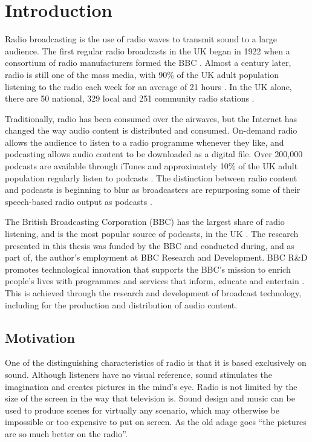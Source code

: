 \chapter{Introduction}\label{sec:intro}

Radio broadcasting is the use of radio waves to transmit sound to a large audience.  The first regular radio broadcasts
in the UK began in 1922 when a consortium of radio manufacturers formed the BBC \citep{BBC2015}.
Almost a century later, radio is still one of the mass media, with 90\% of the UK adult population listening to the
radio each week for an average of 21 hours \citep{RAJAR2017a}.  In the UK alone, there are 50 national, 329 local and
251 community radio stations \citep[pp. 6, 127]{Ofcom2017}.

Traditionally, radio has been consumed over the airwaves, but the Internet has changed the way audio content is
distributed and consumed.  On-demand radio allows the audience to listen to a radio programme whenever they like, and
podcasting allows audio content to be downloaded as a digital file. Over 200,000 podcasts are available through iTunes
\citep{Morgan2015} and approximately 10\% of the UK adult population regularly listen to podcasts \citep{RAJAR2017}.
The distinction between radio content and podcasts is beginning to blur as broadcasters are repurposing some of their
speech-based radio output as podcasts \citep[p.~98]{Ofcom2017}.

The British Broadcasting Corporation (BBC) has the largest share of radio listening, and is the most popular source of
podcasts, in the UK \citep[p. 107]{Ofcom2017}.
The research presented in this thesis was funded by the BBC and conducted during, and as part of, the author's
employment at BBC Research and Development.  BBC R\&D promotes technological innovation that supports the
BBC's mission to enrich people's lives with programmes and services that inform, educate and entertain \citep[art.
15]{BBCCharter2016}.  This is achieved through the research and development of broadcast technology, including for the
production and distribution of audio content.


\section{Motivation}\label{sec:intro-motivation}



One of the distinguishing characteristics of radio is that it is based exclusively on sound.  Although listeners have
no visual reference, sound stimulates the imagination and creates pictures in the mind's eye.  Radio is not limited
by the size of the screen in the way that television is. Sound design and music can be used to produce scenes for
virtually any scenario, which may otherwise be impossible or too expensive to put on screen. As the old adage goes
``the pictures are so much better on the radio''.


